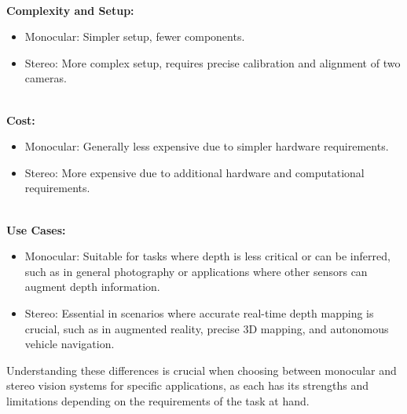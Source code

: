 \documentclass[22pt]{report}
\begin{document}
        \textbf{\\Complexity and Setup:}
        \begin{itemize}
            \item Monocular: Simpler setup, fewer components.
            \item Stereo: More complex setup, requires precise calibration and alignment of two cameras.
        \end{itemize}
        
        \textbf{\\Cost:}
        \begin{itemize}
            \item Monocular: Generally less expensive due to simpler hardware requirements.
            \item Stereo: More expensive due to additional hardware and computational requirements.
        \end{itemize}
    
        \textbf{\\Use Cases:}
        \begin{itemize}
            \item Monocular: Suitable for tasks where depth is less critical or can be inferred, such as in general photography or applications where other sensors can augment depth information.
            \item Stereo: Essential in scenarios where accurate real-time depth mapping is crucial, such as in augmented reality, precise 3D mapping, and autonomous vehicle navigation.
        \end{itemize}
        
        Understanding these differences is crucial when choosing between monocular and stereo vision systems for specific applications, as each has its strengths and limitations depending on the requirements of the task at hand.
\end{document}
